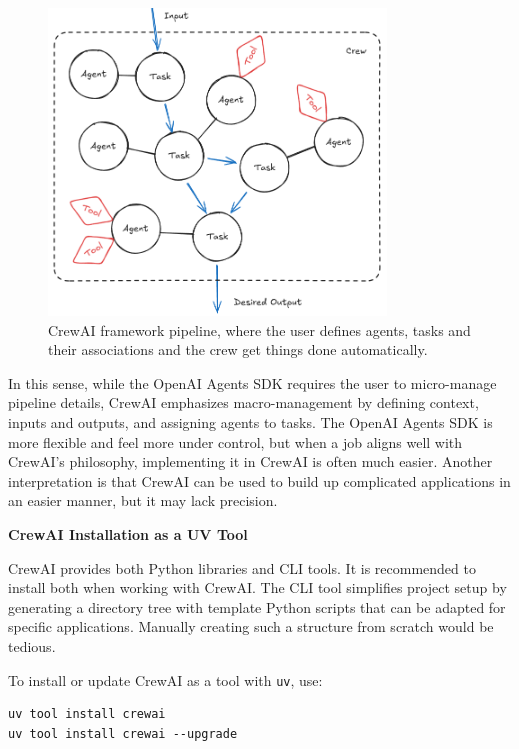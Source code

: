 \begin{figure}[!htb]
	\centering
	\includegraphics[width=0.8\textwidth]{./chapters/part-4/figures/crewai.png}
	\caption{CrewAI framework pipeline, where the user defines agents, tasks and their associations and the crew get things done automatically.}
	\label{fig:crewai_pipeline}
\end{figure}

In this sense, while the OpenAI Agents SDK requires the user to micro-manage pipeline details, CrewAI emphasizes macro-management by defining context, inputs and outputs, and assigning agents to tasks. The OpenAI Agents SDK is more flexible and feel more under control, but when a job aligns well with CrewAI's philosophy, implementing it in CrewAI is often much easier. Another interpretation is that CrewAI can be used to build up complicated applications in an easier manner, but it may lack precision.

\vspace{0.1in}
\noindent \textbf{CrewAI Installation as a UV Tool}
\vspace{0.1in}

CrewAI provides both Python libraries and CLI tools. It is recommended to install both when working with CrewAI. The CLI tool simplifies project setup by generating a directory tree with template Python scripts that can be adapted for specific applications. Manually creating such a structure from scratch would be tedious.

To install or update CrewAI as a tool with \verb|uv|, use:
\begin{lstlisting}
uv tool install crewai
uv tool install crewai --upgrade
\end{lstlisting}

